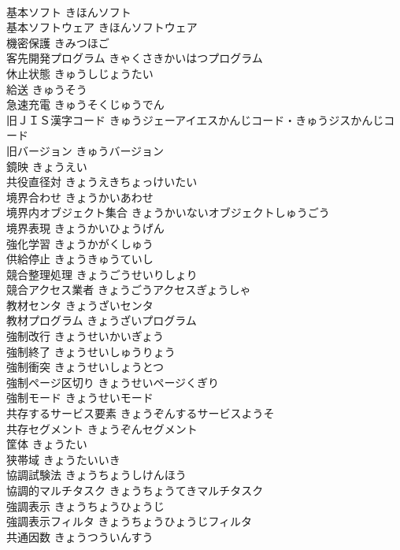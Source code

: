\documentclass[8pt]{extreport}
\begin{document}
\begin{CJK}{UTF8}{min}
\\	基本ソフト	きほんソフト	
\\	基本ソフトウェア	きほんソフトウェア	
\\	機密保護	きみつほご	
\\	客先開発プログラム	きゃくさきかいはつプログラム	
\\	休止状態	きゅうしじょうたい	
\\	給送	きゅうそう	
\\	急速充電	きゅうそくじゅうでん	
\\	旧ＪＩＳ漢字コード	きゅうジェーアイエスかんじコード・きゅうジスかんじコード	
\\	旧バージョン	きゅうバージョン	
\\	鏡映	きょうえい	
\\	共役直径対	きょうえきちょっけいたい	
\\	境界合わせ	きょうかいあわせ	
\\	境界内オブジェクト集合	きょうかいないオブジェクトしゅうごう	
\\	境界表現	きょうかいひょうげん	
\\	強化学習	きょうかがくしゅう	
\\	供給停止	きょうきゅうていし	
\\	競合整理処理	きょうごうせいりしょり	
\\	競合アクセス業者	きょうごうアクセスぎょうしゃ	
\\	教材センタ	きょうざいセンタ	
\\	教材プログラム	きょうざいプログラム	
\\	強制改行	きょうせいかいぎょう	
\\	強制終了	きょうせいしゅうりょう	
\\	強制衝突	きょうせいしょうとつ	
\\	強制ページ区切り	きょうせいページくぎり	
\\	強制モード	きょうせいモード	
\\	共存するサービス要素	きょうぞんするサービスようそ	
\\	共存セグメント	きょうぞんセグメント	
\\	筐体	きょうたい	
\\	狭帯域	きょうたいいき	
\\	協調試験法	きょうちょうしけんほう	
\\	協調的マルチタスク	きょうちょうてきマルチタスク	
\\	強調表示	きょうちょうひょうじ	
\\	強調表示フィルタ	きょうちょうひょうじフィルタ	
\\	共通因数	きょうつういんすう	

\end{CJK}
\end{document}
